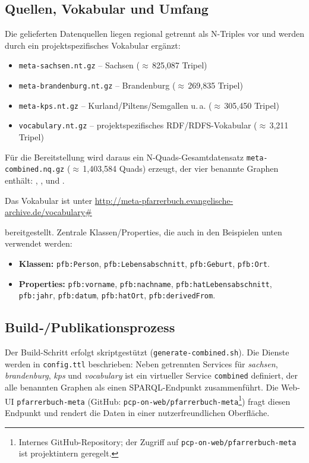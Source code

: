 \subsection{Quellen, Vokabular und Umfang}
Die gelieferten Datenquellen liegen regional getrennt als N-Triples vor und werden durch ein projektspezifisches Vokabular ergänzt:
\begin{itemize}
\item \texttt{meta-sachsen.nt.gz} – Sachsen ($\approx$\,825{,}087 Tripel)
\item \texttt{meta-brandenburg.nt.gz} – Brandenburg ($\approx$\,269{,}835 Tripel)
\item \texttt{meta-kps.nt.gz} – Kurland/Piltens/Semgallen u.\,a. ($\approx$\,305{,}450 Tripel)
\item \texttt{vocabulary.nt.gz} – projektspezifisches RDF/RDFS-Vokabular ($\approx$\,3{,}211 Tripel)
\end{itemize}
Für die Bereitstellung wird daraus ein N-Quads-Gesamtdatensatz \texttt{meta-combined.nq.gz} ($\approx$\,1{,}403{,}584 Quads) erzeugt, der vier benannte Graphen enthält:
, ,  und .

Das Vokabular ist unter
\url{http://meta-pfarrerbuch.evangelische-archive.de/vocabulary\#}

bereitgestellt. Zentrale Klassen/Properties, die auch in den Beispielen unten verwendet werden:
\begin{itemize}
\item \textbf{Klassen:} \texttt{pfb:Person}, \texttt{pfb:Lebensabschnitt}, \texttt{pfb:Geburt}, \texttt{pfb:Ort}.
\item \textbf{Properties:} \texttt{pfb:vorname}, \texttt{pfb:nachname}, \texttt{pfb:hatLebensabschnitt}, \texttt{pfb:jahr}, \texttt{pfb:datum}, \texttt{pfb:hatOrt}, \texttt{pfb:derivedFrom}.
\end{itemize}

\subsection{Build‐/Publikationsprozess}
Der Build-Schritt erfolgt skriptgestützt (\texttt{generate-combined.sh}). Die Dienste werden in \texttt{config.ttl} beschrieben: Neben getrennten Services für \emph{sachsen}, \emph{brandenburg}, \emph{kps} und \emph{vocabulary} ist ein virtueller Service \texttt{combined} definiert, der alle benannten Graphen als einen SPARQL-Endpunkt zusammenführt. Die Web-UI \texttt{pfarrerbuch-meta} (GitHub: \texttt{pcp-on-web/pfarrerbuch-meta}\footnote{Internes GitHub-Repository; der Zugriff auf \texttt{pcp-on-web/pfarrerbuch-meta} ist projektintern geregelt.}) fragt diesen Endpunkt und rendert die Daten in einer nutzerfreundlichen Oberfläche.

